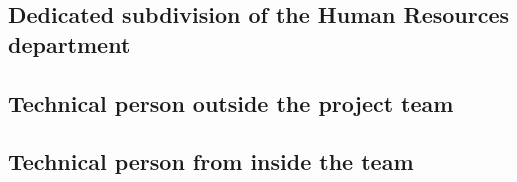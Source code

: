 \newline

\subsection{Dedicated subdivision of the Human Resources department}
\label{sub-sec:hrdep}

 \newline

\subsection{Technical person outside the project team}
\label{sub-sec:techout}

 \newline

\subsection{Technical person from inside the team}
\label{sub-sec:techin}

 \newline

